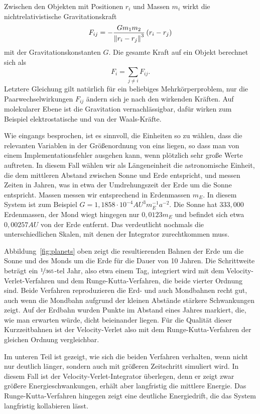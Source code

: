 Zwischen den Objekten mit Positionen $r_i$ und Massen $m_i$ wirkt die
nichtrelativistische Gravitationskraft
\begin{equation}
  F_{ij} = -\frac{G m_1 m_2}{\left\lVert{r_i - r_j}\right\rVert^3}\left(r_i - r_j\right)
\end{equation}
mit der Gravitationskonstanten $G$. Die gesamte Kraft auf ein Objekt
berechnet sich als
\begin{equation}
  F_{i} = \sum_{j\neq i} F_{ij}.
\end{equation}
Letztere Gleichung gilt natürlich für ein beliebiges
Mehrkörperproblem, nur die Paarwechselwirkungen $F_{ij}$ ändern sich
je nach den wirkenden Kräften. Auf molekularer Ebene ist die
Gravitation vernachlässigbar, dafür wirken zum Beispiel
elektrostatische und van der Waals-Kräfte.

Wie eingangs besprochen, ist es sinnvoll, die Einheiten so zu wählen,
dass die relevanten Variablen in der Größenordnung von eins liegen, so
dass man von einem Implementationsfehler ausgehen kann, wenn plötzlich
sehr große Werte auftreten. In diesem Fall wählen wir als
Längeneinheit die astronomische Einheit, die dem mittleren Abstand
zwischen Sonne und Erde entspricht, und messen Zeiten in Jahren, was
in etwa der Umdrehungszeit der Erde um die Sonne entspricht. Massen
messen wir entsprechend in Erdenmassen $m_E$. In diesem System ist zum
Beispiel $G=1,1858\cdot 10^{-4} AU^3 m_E^{-1} a^{-2}$. Die Sonne hat
$333,000$ Erdenmassen, der Mond wiegt hingegen nur $0,0123m_E$ und
befindet sich etwa $0,00257AU$ von der Erde entfernt. Das verdeutlicht
nochmals die unterschiedlichen Skalen, mit denen der Integrator
zurechtkommen muss.

Abbildung~\ref{fig:planets} oben zeigt die resultierenden Bahnen der
Erde um die Sonne und des Monds um die Erde für die Dauer von 10
Jahren. Die Schrittweite beträgt ein $\nicefrac{1}{365}$-tel Jahr,
also etwa einem Tag, integriert wird mit dem Velocity-Verlet-Verfahren
und dem Runge-Kutta-Verfahren, die beide vierter Ordnung sind. Beide
Verfahren reproduzieren die Erd- und auch Mondbahnen recht gut, auch
wenn die Mondbahn aufgrund der kleinen Abstände stärkere Schwankungen
zeigt. Auf der Erdbahn wurden Punkte im Abstand eines Jahres markiert,
die, wie man erwarten würde, dicht beieinander liegen. Für die
Qualität dieser Kurzzeitbahnen ist der Velocity-Verlet also mit dem
Runge-Kutta-Verfahren der gleichen Ordnung vergleichbar.

Im unteren Teil ist gezeigt, wie sich die beiden Verfahren verhalten,
wenn nicht nur deutlich länger, sondern auch mit größeren Zeitschritt
simuliert wird. In diesem Fall ist der Velocity-Verlet-Integrator
überlegen, denn er zeigt zwar größere Energieschwankungen, erhält aber
langfristig die mittlere Energie. Das Runge-Kutta-Verfahren hingegen
zeigt eine deutliche Energiedrift, die das System langfristig
kollabieren lässt.


